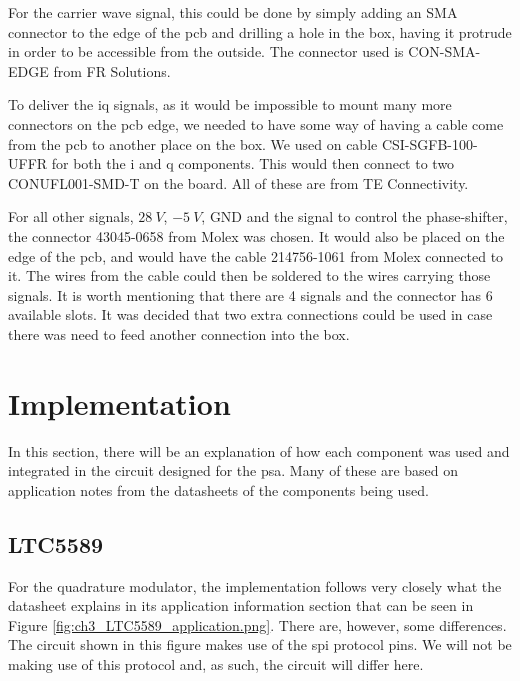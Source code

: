 \par For the carrier wave signal, this could be done by simply adding an SMA connector to the edge of the \ac{pcb} and drilling a hole in the box, having it protrude in order to be accessible from the outside. The connector used is CON-SMA-EDGE from FR Solutions.

\par To deliver the \ac{iq} signals, as it would be impossible to mount many more connectors on the \ac{pcb} edge, we needed to have some way of having a cable come from the \ac{pcb} to another place on the box. We used on cable CSI-SGFB-100-UFFR for both the \ac{i} and \ac{q} components. This would then connect to two CONUFL001-SMD-T on the board. All of these are from TE Connectivity.

\par For all other signals, $28 \:\si{V}$, $-5 \:\si{V}$, GND and the signal to control the phase-shifter, the connector 43045-0658 from Molex was chosen. It would also be placed on the edge of the \ac{pcb}, and would have the cable 214756-1061 from Molex connected to it. The wires from the cable could then be soldered to the wires carrying those signals. It is worth mentioning that there are 4 signals and the connector has 6 available slots. It was decided that two extra connections could be used in case there was need to feed another connection into the box.

\section{Implementation}
\par In this section, there will be an explanation of how each component was used and integrated in the circuit designed for the \ac{psa}. Many of these are based on application notes from the datasheets of the components being used.

\subsection{LTC5589}
\par For the quadrature modulator, the implementation follows very closely what the datasheet explains in its application information section that can be seen in Figure \ref{fig:ch3_LTC5589_application.png}. There are, however, some differences. The circuit shown in this figure makes use of the \ac{spi} protocol pins. We will not be making use of this protocol and, as such, the circuit will differ here.

